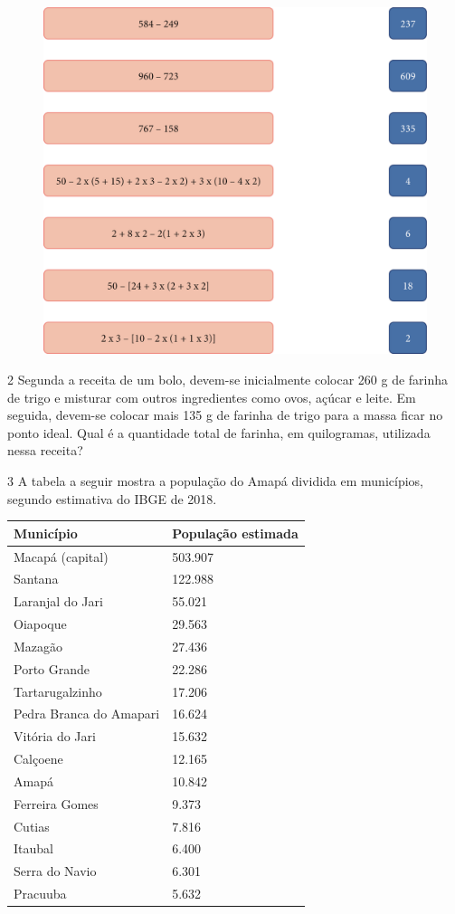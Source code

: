 \begin{figure}[htpb!]
\centering
\includegraphics[width=\textwidth]{media/image14.png}
\end{figure}

\num{2} Segunda a receita de um bolo, devem-se inicialmente colocar 260 g de farinha
de trigo e misturar com outros ingredientes como ovos, açúcar e leite.
Em seguida, devem-se colocar mais 135 g de farinha de trigo para a massa
ficar no ponto ideal. Qual é a quantidade total de farinha, em quilogramas,
utilizada nessa receita?

\begin{mdframed}[linewidth=2pt,linecolor=salmao,roundcorner=2pt]
\vspace{3cm}
\end{mdframed}

\num{3} A tabela a seguir mostra a população do Amapá dividida em municípios, segundo estimativa do IBGE de 2018.

\begin{longtable}[]{@{}ll@{}}
\toprule
Município & População estimada\tabularnewline
\midrule
\endhead
Macapá (capital) & 503.907\tabularnewline
Santana & 122.988\tabularnewline
Laranjal do Jari & 55.021\tabularnewline
Oiapoque & 29.563\tabularnewline
Mazagão & 27.436\tabularnewline
Porto Grande & 22.286\tabularnewline
Tartarugalzinho & 17.206\tabularnewline
Pedra Branca do Amapari & 16.624\tabularnewline
Vitória do Jari & 15.632\tabularnewline
Calçoene & 12.165\tabularnewline
Amapá & 10.842\tabularnewline
Ferreira Gomes & 9.373\tabularnewline
Cutias & 7.816\tabularnewline
Itaubal & 6.400\tabularnewline
Serra do Navio & 6.301\tabularnewline
Pracuuba & 5.632\tabularnewline
\bottomrule
\end{longtable}

